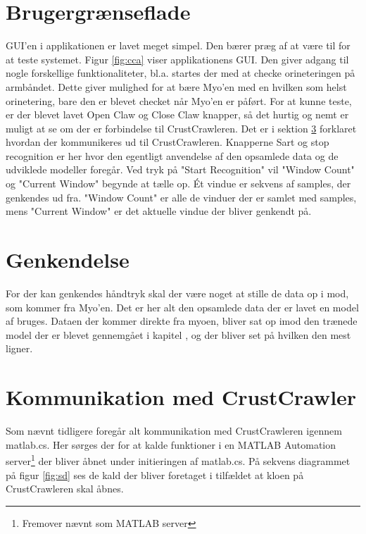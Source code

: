 \section{Brugergrænseflade}
GUI'en i applikationen er lavet meget simpel. Den bærer præg af at være til for at teste systemet. Figur \ref{fig:cca} viser applikationens GUI. Den giver adgang til nogle forskellige funktionaliteter, bl.a. startes der med at checke orineteringen på armbåndet. Dette giver mulighed for at bære Myo'en med en hvilken som helst orinetering, bare den er blevet checket når Myo'en er påført. For at kunne teste, er der blevet lavet Open Claw og Close Claw knapper, så det hurtig og nemt er muligt at se om der er forbindelse til CrustCrawleren. Det er i sektion \ref{sec:ktc} forklaret hvordan der kommunikeres ud til CrustCrawleren.
Knapperne Sart og stop recognition er her hvor den egentligt anvendelse af den opsamlede data og de udviklede modeller foregår. Ved tryk på "Start Recognition" vil "Window Count" og "Current Window" begynde at tælle op. Ét vindue er sekvens af samples, der genkendes ud fra. "Window Count" er alle de vinduer der er samlet med samples, mens "Current Window" er det aktuelle vindue der bliver genkendt på.

\section{Genkendelse}
For der kan genkendes håndtryk skal der være noget at stille de data op i mod, som kommer fra Myo'en. Det er her alt den opsamlede data der er lavet en model af bruges. Dataen der kommer direkte fra myoen, bliver sat op imod den trænede model der er blevet gennemgået i kapitel , og der bliver set på hvilken den mest ligner. 


\section{Kommunikation med CrustCrawler}
\label{sec:ktc}
Som nævnt tidligere foregår alt kommunikation med CrustCrawleren igennem matlab.cs. Her sørges der for at kalde funktioner i en MATLAB Automation server\footnote{Fremover nævnt som MATLAB server} der bliver åbnet under initieringen af matlab.cs. På sekvens diagrammet på figur \ref{fig:sd} ses de kald der bliver foretaget i tilfældet at kloen på CrustCrawleren skal åbnes.

